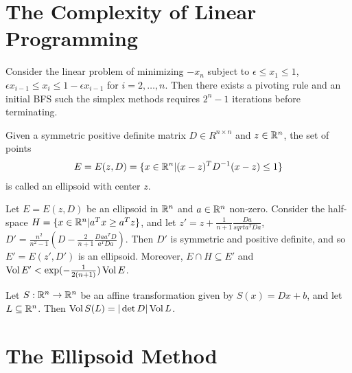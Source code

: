 \section{The Complexity of Linear Programming}
\label{sec:compl-line-progr}

\begin{thm}
  \label{sec:compl-line-progr-1}
  Consider the linear problem of minimizing $-x_{n}$ subject to
  $\epsilon \leq x_{1} \leq 1$, $\epsilon x_{i-1} \leq x_{i} \leq 1 -
  \epsilon x_{i-1}$ for $i = 2, \dots, n$. Then there exists a
  pivoting rule and an initial BFS such the simplex methods requires
  $2^{n} - 1$ iterations before terminating.
\end{thm}

\begin{defn}
  \label{sec:compl-line-progr-2}
  Given a symmetric positive definite matrix $D \in R^{n \times n}$
  and $z \in \mathbb{R}^{n}$, the set of points
  \begin{align}
    \label{eq:5}
    E = E(z, D) = \{ x \in \mathbb{R}^{n} | (x - z)^{T} D^{-1}(x - z) \leq 1 \} 
  \end{align} is called an ellipsoid with center $z$.
\end{defn}

\begin{thm}
  \label{sec:compl-line-progr-3}
  Let $E = E(z, D)$ be an ellipsoid in $\mathbb{R}^{n}$ and $a \in \mathbb{R}^{n}$
  non-zero.  Consider the half-space $H = \{ x \in \mathbb{R}^{n} | a^{T} x
  \geq a^{T}z \} $, and let $z' = z + \frac{1}{n+1}
  \frac{Da}{sqrt{a^{T}Da}}$, $D' = \frac{n^{2}}{n^{2} - 1}(D -
  \frac{2}{n+1}\frac{Daa^{T}D}{a^{T}Da})$.  Then $D'$ is symmetric and
  positive definite, and so $E' = E(z', D')$ is an ellipsoid.
  Moreover, $E \cap H \subseteq E'$ and $\operatorname*{Vol} E' <
  \exp(-\frac{1}{2(n+1)}) \operatorname*{Vol} E$.
\end{thm}

\begin{thm}
  \label{sec:compl-line-progr-4}
  Let $S: \mathbb{R}^{n} \rightarrow \mathbb{R}^{n}$ be an affine transformation given
  by $S(x) = Dx + b$, and let $L \subseteq \mathbb{R}^{n}$.  Then $\operatorname*{Vol} S(L) =
  |\det D| \operatorname*{Vol} L$.
\end{thm}

\section{The Ellipsoid Method}
\label{sec:ellipsoid-method}

